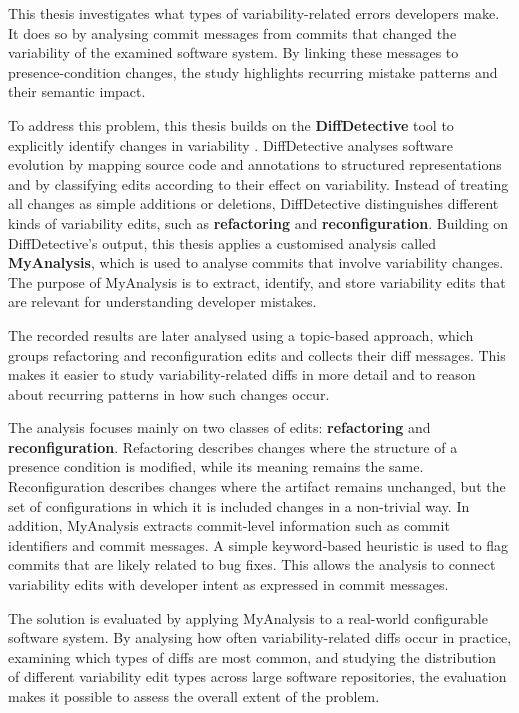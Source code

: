 This thesis investigates what types of variability-related errors developers make. It does so by analysing commit messages from commits that changed the variability of the examined software system. By linking these messages to presence-condition changes, the study highlights recurring mistake patterns and their semantic impact.

To address this problem, this thesis builds on the \textbf{DiffDetective} tool to explicitly identify changes in variability \cite{Bittner2022_edits}. DiffDetective analyses software evolution by mapping source code and annotations to structured representations and by classifying edits according to their effect on variability. Instead of treating all changes as simple additions or deletions, DiffDetective distinguishes different kinds of variability edits, such as \textbf{refactoring} and \textbf{reconfiguration}. Building on DiffDetective's output, this thesis applies a customised analysis called \textbf{MyAnalysis}, which is used to analyse commits that involve variability changes. The purpose of MyAnalysis is to extract, identify, and store variability edits that are relevant for understanding developer mistakes.

The recorded results are later analysed using a topic-based approach, which groups refactoring and reconfiguration edits and collects their diff messages. This makes it easier to study variability-related diffs in more detail and to reason about recurring patterns in how such changes occur.

The analysis focuses mainly on two classes of edits: \textbf{refactoring} and \textbf{reconfiguration}. Refactoring describes changes where the structure of a presence condition is modified, while its meaning remains the same. Reconfiguration describes changes where the artifact remains unchanged, but the set of configurations in which it is included changes in a non-trivial way. In addition, MyAnalysis extracts commit-level information such as commit identifiers and commit messages. A simple keyword-based heuristic is used to flag commits that are likely related to bug fixes. This allows the analysis to connect variability edits with developer intent as expressed in commit messages.

The solution is evaluated by applying MyAnalysis to a real-world configurable software system. By analysing how often variability-related diffs occur in practice, examining which types of diffs are most common, and studying the distribution of different variability edit types across large software repositories, the evaluation makes it possible to assess the overall extent of the problem.

